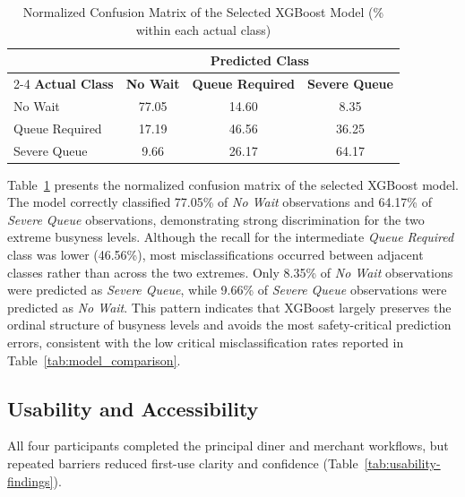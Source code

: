 \documentclass[conference]{IEEEtran}
\begin{document}
\begin{table}[htbp]
    \centering
    \caption{Normalized Confusion Matrix of the Selected XGBoost Model (\% within each actual class)}
    \label{tab:xgboost_confusion_matrix}

    \begin{tabular}{lccc}
        \toprule
        & \multicolumn{3}{c}{\textbf{Predicted Class}} \\
        \cmidrule(lr){2-4}
        \textbf{Actual Class}
        & \textbf{No Wait}
        & \textbf{Queue Required}
        & \textbf{Severe Queue} \\
        \midrule

        No Wait
        & 77.05
        & 14.60
        & 8.35 \\

        Queue Required
        & 17.19
        & 46.56
        & 36.25 \\

        Severe Queue
        & 9.66
        & 26.17
        & 64.17 \\

        \bottomrule
    \end{tabular}
\end{table}


Table~\ref{tab:xgboost_confusion_matrix} presents the normalized confusion matrix of the selected XGBoost model. The model correctly classified 77.05\% of \textit{No Wait} observations and 64.17\% of \textit{Severe Queue} observations, demonstrating strong discrimination for the two extreme busyness levels. Although the recall for the intermediate \textit{Queue Required} class was lower (46.56\%), most misclassifications occurred between adjacent classes rather than across the two extremes. Only 8.35\% of \textit{No Wait} observations were predicted as \textit{Severe Queue}, while 9.66\% of \textit{Severe Queue} observations were predicted as \textit{No Wait}. This pattern indicates that XGBoost largely preserves the ordinal structure of busyness levels and avoids the most safety-critical prediction errors, consistent with the low critical misclassification rates reported in Table~\ref{tab:model_comparison}.

\subsection{Usability and Accessibility}
All four participants completed the principal diner and merchant workflows, but repeated barriers reduced first-use clarity and confidence (Table~\ref{tab:usability-findings}).
\end{document}
